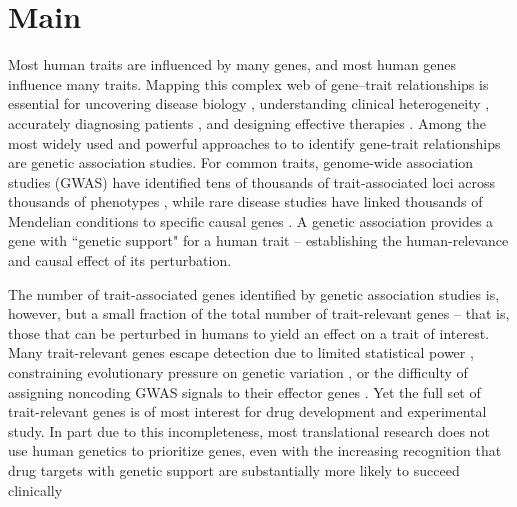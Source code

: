\documentclass[sn-nature,lineno]{sn-jnl}%
\theoremstyle{thmstyleone}%
\theoremstyle{thmstyletwo}%
\theoremstyle{thmstylethree}%
\begin{document}
\section{Main}\label{sec:introduction}

Most human traits are influenced by many genes, and most human genes influence many traits. Mapping this complex web of gene–trait relationships is essential for uncovering disease biology \cite{cohen_sequence_2006}, understanding clinical heterogeneity \cite{udler_type_2018}, accurately diagnosing patients \cite{yang_clinical_2013}, and designing effective therapies \cite{plenge_validating_2013}. Among the most widely used and powerful approaches to to identify gene-trait relationships are genetic association studies. For common traits, genome-wide association studies (GWAS) have identified tens of thousands of trait-associated loci across thousands of phenotypes \cite{abdellaoui_15_2023}, while rare disease studies have linked thousands of Mendelian conditions to specific causal genes \cite{chung_meta-analysis_2023}. A genetic association provides a gene with ``genetic support" for a human trait -- establishing the human-relevance and causal effect of its perturbation.

The number of trait-associated genes identified by genetic association studies is, however, but a small fraction of the total number of trait-relevant genes -- that is, those that can be perturbed in humans to yield an effect on a trait of interest\cite{finan_druggable_2017}. Many trait-relevant genes escape detection due to limited statistical power \cite{wang_statistical_2019}, constraining evolutionary pressure on genetic variation \cite{gazal_linkage_2017}, or the difficulty of assigning noncoding GWAS signals to their effector genes \cite{schipper_demystifying_2022,costanzo_realizing_2025}. Yet the full set of trait-relevant genes is of most interest for drug development and experimental study\cite{jhamb_pathway_2019,macnamara_network_2020}. In part due to this incompleteness, most translational research does not use human genetics to prioritize genes\cite{wehling_assessing_2009,dornbos_evaluating_2022}, even with the  increasing recognition that drug targets with genetic support are substantially more likely to succeed clinically\cite{plenge_validating_2013,minikel_refining_2024} 
\end{document}
